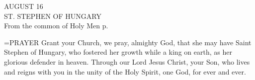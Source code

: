 \begin{center}\normalsize AUGUST 16\\
\footnotesize ST. STEPHEN OF HUNGARY\\
\footnotesize From the common of Holy Men p. \\
\end{center}

\hangindent=\parindent \small{PRAYER 
Grant your Church, we pray, almighty God,
that she may have Saint Stephen of Hungary,
who fostered her growth while a king on earth,
as her glorious defender in heaven.
Through our Lord Jesus Christ, your Son,
who lives and reigns with you in the unity of the Holy Spirit,
one God, for ever and ever.\\}
 
